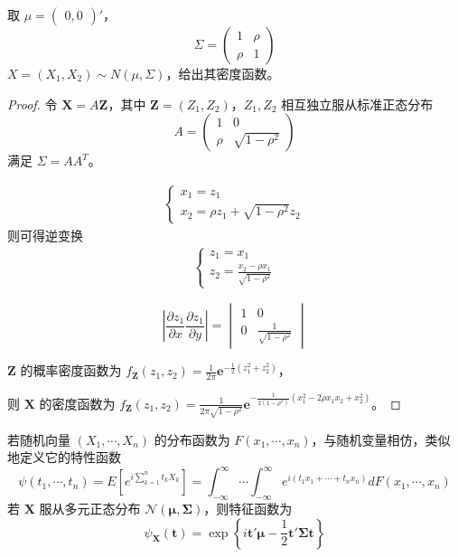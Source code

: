 \documentclass[lang=cn,10pt,thmcnt=section]{elegantbook}
\begin{document}
\begin{example}
	取 $\mu = \begin{pmatrix} 0, 0 \end{pmatrix}'$，
\[
\Sigma = \begin{pmatrix} 1 & \rho \\ \rho & 1 \end{pmatrix}
\]
$X = (X_1, X_2) \sim N(\mu, \Sigma)$，给出其密度函数。
\end{example}
\begin{proof}
	令 $\mathbf{X} = A\mathbf{Z}$，其中 $\mathbf{Z} = (Z_1, Z_2)$，$Z_1, Z_2$ 相互独立服从标准正态分布
\[
A = \begin{pmatrix} 1 & 0 \\ \rho & \sqrt{1-\rho^2} \end{pmatrix}
\]
满足 $\Sigma = AA^T$。

\begin{align*}
\begin{cases}
x_1 = z_1 \\
x_2 = \rho z_1 + \sqrt{1-\rho^2} z_2
\end{cases}
\end{align*}
则可得逆变换
\begin{align*}
\begin{cases}
z_1 = x_1 \\
z_2 = \frac{x_2 - \rho x_1}{\sqrt{1-\rho^2}}
\end{cases}
\end{align*}

\[
\left| \frac{\partial z_1}{\partial x} \frac{\partial z_1}{\partial y} \right| = \begin{vmatrix} 1 & 0 \\ 0 & \frac{1}{\sqrt{1-\rho^2}} \end{vmatrix}
\]

$\mathbf{Z}$ 的概率密度函数为 $f_{\mathbf{Z}}(z_1, z_2) = \frac{1}{2\pi} \mathbf{e}^{-\frac{1}{2}(z_1^2 + z_2^2)}$，

则 $\mathbf{X}$ 的密度函数为 $f_{\mathbf{Z}}(z_1, z_2) = \frac{1}{2\pi\sqrt{1-\rho^2}} \mathbf{e}^{-\frac{1}{2(1-\rho^2)}(x_1^2 - 2\rho x_1 x_2 + x_2^2)}$。
\end{proof}

若随机向量 $(X_1, \cdots, X_n)$ 的分布函数为 $F(x_1, \cdots, x_n)$，与随机变量相仿，类似地定义它的特性函数
\[
\psi(t_1, \cdots, t_n) = E\left[e^{i \sum_{k=1}^{n} t_k X_k}\right] = \int_{-\infty}^{\infty} \cdots \int_{-\infty}^{\infty} e^{i(t_1 x_1 + \cdots + t_n x_n)} dF(x_1, \cdots, x_n)
\]
若 $\mathbf{X}$ 服从多元正态分布 $\mathcal{N}(\boldsymbol{\mu}, \boldsymbol{\Sigma})$，则特征函数为
\[
\psi_{\mathbf{X}}(\mathbf{t}) = \exp\left\{i \mathbf{t}' \boldsymbol{\mu} - \frac{1}{2} \mathbf{t}' \boldsymbol{\Sigma} \mathbf{t}\right\}
\]
\end{document}
